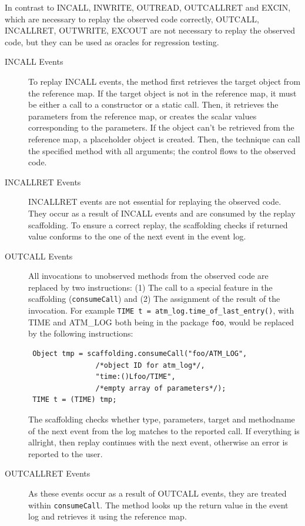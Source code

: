 In contrast to INCALL, INWRITE, OUTREAD, OUTCALLRET and EXCIN, which are necessary to replay the observed code correctly, OUTCALL, INCALLRET, OUTWRITE, EXCOUT are not necessary to replay the observed code, but they can be used as oracles for regression testing. %

\begin{description}
 \item [INCALL Events] To replay INCALL events, the method first retrieves the target object from the reference map. If the target object is not in the reference map, it must be either a call to a constructor or a static call. Then, it retrieves the parameters from the reference map, or creates the scalar values corresponding to the parameters. If the object can't be retrieved from the reference map, a placeholder object is created. Then, the technique can call the specified method with all arguments; the control flows to the observed code. 
 \item [INCALLRET Events] INCALLRET events are not essential for replaying the observed code. They occur as a result of INCALL events and are consumed by the replay scaffolding. To ensure a correct replay, the scaffolding checks if returned value conforms to the one of the next event in the event log.
 \item [OUTCALL Events] All invocations to unobserved methods from the observed code are replaced by two instructions: (1) The call to a special feature in the scaffolding (\texttt{consumeCall}) and (2) The assignment of the result of the invocation. For example \texttt{TIME t = atm\_log.time\_of\_last\_entry()}, with TIME and ATM\_LOG both being in the package \texttt{foo}, would be replaced by the following instructions:
\begin{lstlisting}
 Object tmp = scaffolding.consumeCall("foo/ATM_LOG",
                /*object ID for atm_log*/,
                "time:()Lfoo/TIME",
                /*empty array of parameters*/);
 TIME t = (TIME) tmp;
\end{lstlisting}
The scaffolding checks whether type, parameters, target and methodname of the next event from the log matches to the reported call. If everything is allright, then replay continues with the next event, otherwise an error is reported to the user.
 \item [OUTCALLRET Events]As these events occur as a result of OUTCALL events, they are treated within \texttt{consumeCall}. The method looks up the return value in the event log and retrieves it using the reference map. 

\end{description}
